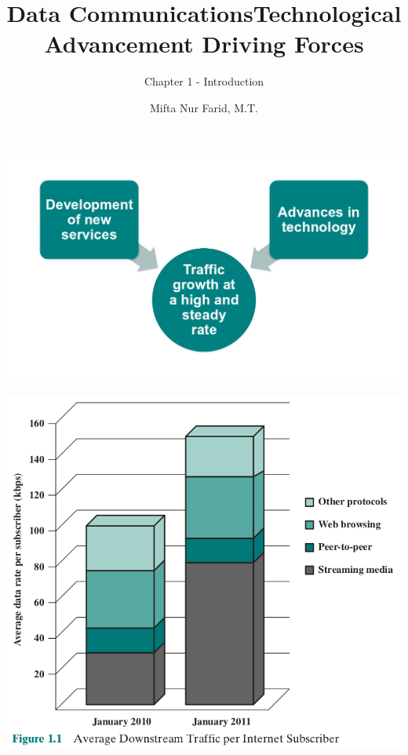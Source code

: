 \documentclass[pdflatex,compress]{beamer}
\title{Data Communications}
\subtitle{Chapter 1 - Introduction}
\author{Mifta Nur Farid, M.T.}
\begin{document}
\maketitle

\begin{frame}
	\title{Technological Advancement Driving Forces}
	\begin{center}
		\includegraphics[width=\linewidth]{img/img01}
	\end{center}
\end{frame}

\begin{frame}
	\begin{center}
		\includegraphics[height=0.8\textheight]{img/img02}
	\end{center}
\end{frame}
\end{document}
